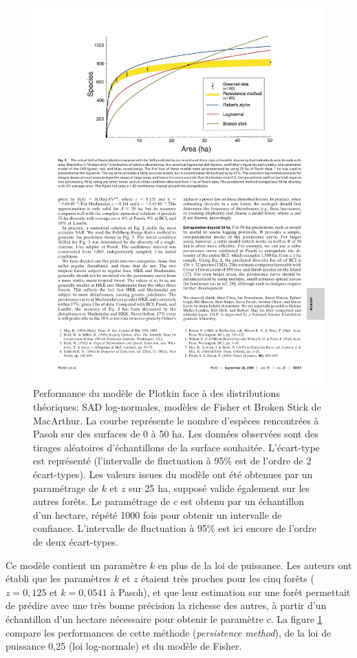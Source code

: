 \documentclass[
  11pt,
  french,
  a4paper,
  extrafontsizes,onecolumn,openright
  ]{memoir}
\newlength{\rf}
\begin{document}
\begin{figure}

{\centering \includegraphics[width=0.8\linewidth]{images/Plotkin2000b} 

}

\caption{Performance du modèle de Plotkin face à des distributions théoriques: SAD log-normales, modèles de Fisher et Broken Stick de MacArthur. La courbe représente le nombre d'espèces rencontrées à Pasoh sur des surfaces de 0 à 50 ha. Les données observées sont des tirages aléatoires d'échantillons de la surface souhaitée. L'écart-type est représenté (l'intervalle de fluctuation à 95\% est de l'ordre de 2 écart-types). Les valeurs issues du modèle ont été obtenues par un paramétrage de \(k\) et \(z\) sur 25 ha, supposé valide également sur les autres forêts. Le paramétrage de \(c\) est obtenu par un échantillon d'un hectare, répété 1000 fois pour obtenir un intervalle de confiance. L'intervalle de fluctuation à 95\% est ici encore de l'ordre de deux écart-types.}\label{fig:Plotkin2000b}
\end{figure}

\normalsize

Ce modèle contient un paramètre \(k\) en plus de la loi de puissance.
Les auteurs ont établi que les paramètres \(k\) et \(z\) étaient très proches pour les cinq forêts (\(z=0,125\) et \(k=0,0541\) à Pasoh), et que leur estimation sur une forêt permettait de prédire avec une très bonne précision la richesse des autres, à partir d'un échantillon d'un hectare nécessaire pour obtenir le paramètre \(c\).
La figure \ref{fig:Plotkin2000b} compare les performances de cette méthode (\emph{persistence method}), de la loi de puissance 0,25 (loi log-normale) et du modèle de Fisher.
\end{document}

